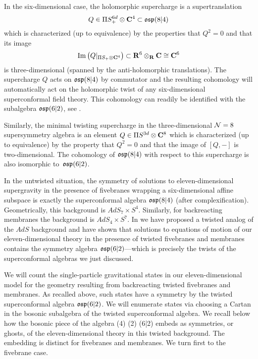 In the six-dimensional case, the holomorphic supercharge is a supertranslation 
\[
Q \in \Pi S^{6d}_+ \otimes \mathbf{C}^4 \subset \mathfrak{osp}(8|4)
\]
which is characterized (up to equivalence) by the properties that $Q^2 = 0$ and that its image
\[
{\rm Im}\left(Q|_{\Pi S_+ \otimes \mathbf{C}^4} \right) \subset \mathbf{R}^6 \otimes_{\mathbf{R}} \mathbf{C} \cong \mathbf{C}^6
\]
is three-dimensional (spanned by the anti-holomorphic translations). 
The supercharge $Q$ acts on $\mathfrak{osp}(8|4)$ by commutator and the resulting cohomology will automatically act on the holomorphic twist of any six-dimensional superconformal field theory. 
This cohomology can readily be identified with the subalgebra $\mathfrak{osp}(6|2)$, see \cite{SWe36}. 

Similarly, the minimal twisting supercharge in the three-dimensional $\mathcal N=8$ supersymmetry algebra is an element $Q \in \Pi S^{3d} \otimes \mathbf{C}^8$ which is characterized (up to equivalence) by the property that $Q^2 = 0$ and that the image of $[Q,-]$ is two-dimensional. 
The cohomology of $\mathfrak{osp}(8|4)$ with respect to this supercharge is also isomorphic to~$\mathfrak{osp}(6|2)$. 

In the untwisted situation, the symmetry of solutions to eleven-dimensional supergravity in the presence of fivebranes wrapping a six-dimensional affine subspace is exactly the superconformal algebra $\mathfrak{osp}(8|4)$ (after complexification). 
Geometrically, this background is $AdS_7 \times S^4$. 
Similarly, for backreacting membranes the background is $AdS_4 \times S^7$. 
In \cite{RSW} we have proposed a twisted analog of the $AdS$ background and have shown that solutions to equations of motion of our eleven-dimensional theory in the presence of twisted fivebranes and membranes contains the symmetry algebra $\mathfrak{osp}(6|2)$---which is precisely the twists of the superconformal algebras we just discussed.

We will count the single-particle gravitational states in our eleven-dimensional model for the geometry resulting from backreacting twisted fivebranes and membranes.
As recalled above, such states have a symmetry by the twisted superconformal algebra $\mathfrak{osp}(6|2)$.
We will enumerate states via choosing a Cartan in the bosonic subalgebra of the twisted superconformal algebra. 
We recall below how the bosonic piece of the algebra
\beqn
\label{eqn:gut}
(4) \times {}(2) \subset {}(6|2) 
\eeqn
embeds as symmetries, or ghosts, of the eleven-dimensional theory in this twisted background.
The embedding is distinct for fivebranes and membranes.
We turn first to the fivebrane case.

